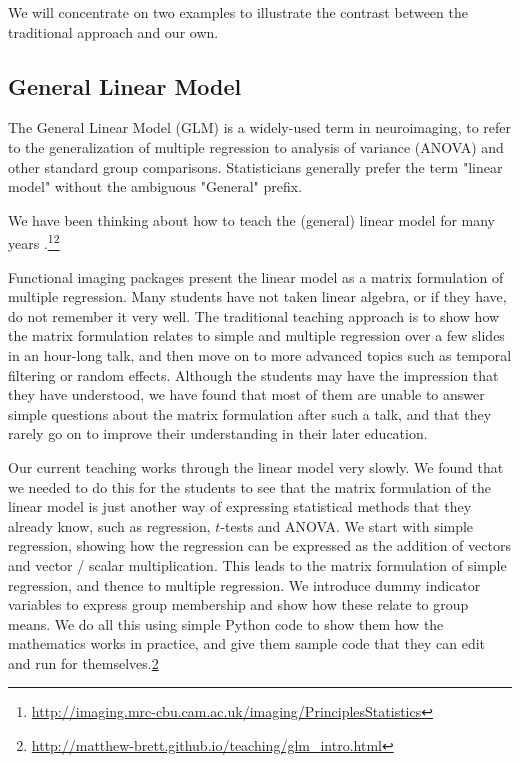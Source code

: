 We will concentrate on two examples to illustrate the contrast between the
traditional approach and our own.

\subsection{General Linear Model}

The General Linear Model (GLM) is a widely-used term in neuroimaging, to refer
to the generalization of multiple regression to analysis of variance (ANOVA)
and other standard group comparisons.  Statisticians generally prefer the term
"linear model" without the ambiguous "General" prefix.

We have been thinking about how to teach the (general) linear model for many
years
\citep{poline2012general}.\footnote{\url{http://imaging.mrc-cbu.cam.ac.uk/imaging/PrinciplesStatistics}}\footnote{\label{glm_intro}
\url{http://matthew-brett.github.io/teaching/glm_intro.html}}

Functional imaging packages present the linear model as a matrix formulation
of multiple regression.  Many students have not taken linear algebra, or if
they have, do not remember it very well.  The traditional teaching approach is
to show how the matrix formulation relates to simple and multiple regression
over a few slides in an hour-long talk, and then move on to more advanced
topics such as temporal filtering or random effects.  Although the students
may have the impression that they have understood, we have found that most of
them are unable to answer simple questions about the matrix formulation after
such a talk, and that they rarely go on to improve their understanding in
their later education.

Our current teaching works through the linear model very slowly. We found that
we needed to do this for the students to see that the matrix formulation of
the linear model is just another way of expressing statistical methods that
they already know, such as regression, $t$-tests and ANOVA.  We start with
simple regression, showing how the regression can be expressed as the addition
of vectors and vector / scalar multiplication.  This leads to the matrix
formulation of simple regression, and thence to multiple regression.  We
introduce dummy indicator variables to express group membership and show how
these relate to group means.  We do all this using simple Python code to show
them how the mathematics works in practice, and give them sample code that
they can edit and run for themselves.\cref{glm_intro}

